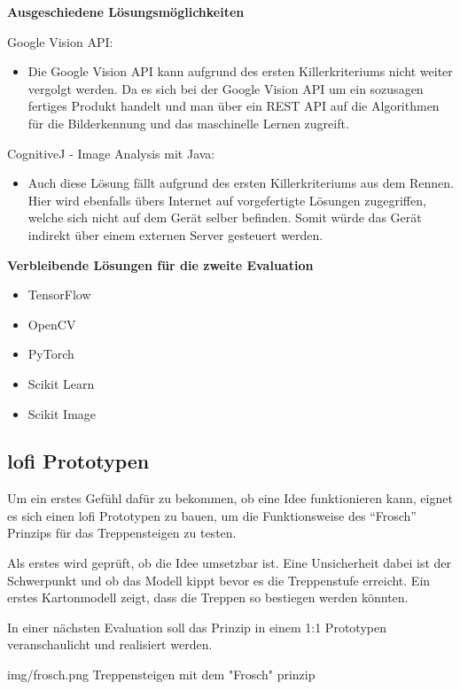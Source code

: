 \textbf{Ausgeschiedene Lösungsmöglichkeiten}

Google Vision API:
\begin{itemize}
    \item Die Google Vision API kann aufgrund des ersten Killerkriteriums nicht weiter vergolgt werden. Da es sich bei der Google Vision API um ein sozusagen fertiges Produkt handelt und man über ein REST API auf die Algorithmen für die Bilderkennung und das maschinelle Lernen zugreift.
\end{itemize}

CognitiveJ - Image Analysis mit Java:
\begin{itemize}
    \item Auch diese Lösung fällt aufgrund des ersten Killerkriteriums aus dem Rennen. Hier wird ebenfalls übers Internet auf vorgefertigte Lösungen zugegriffen, welche sich nicht auf dem Gerät selber befinden. Somit würde das Gerät indirekt über einem externen Server gesteuert werden.
\end{itemize}

\textbf{Verbleibende Lösungen für die zweite Evaluation}
\begin{itemize}
    \item TensorFlow 
    \item OpenCV
    \item PyTorch
    \item Scikit Learn
    \item Scikit Image
\end{itemize}

\subsection{\acrshort{lofi} Prototypen}

Um ein erstes Gefühl dafür zu bekommen, ob eine Idee funktionieren kann, eignet es 
sich einen \acrfull{lofi} Prototypen zu bauen, um die Funktionsweise
des ``Frosch'' Prinzips für das Treppensteigen zu testen.

Als erstes wird geprüft, ob die Idee umsetzbar ist.
Eine Unsicherheit dabei ist der Schwerpunkt und ob das Modell kippt
bevor es die Treppenstufe erreicht. Ein erstes Kartonmodell zeigt,
dass die Treppen so bestiegen werden könnten.

In einer nächsten Evaluation soll das Prinzip in einem 1:1 Prototypen veranschaulicht und realisiert werden.

\image
 {img/frosch.png}
 {Treppensteigen mit dem "Frosch" prinzip}
